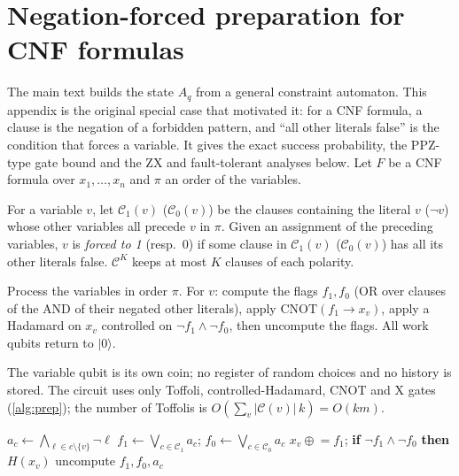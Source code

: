 \section{Negation-forced preparation for CNF formulas}\label{sec:nf}
The main text builds the state $A_q$ from a general constraint automaton. This appendix is the original special case that motivated it: for a CNF formula, a clause is the negation of a forbidden pattern, and ``all other literals false'' is the condition that forces a variable. It gives the exact success probability, the PPZ-type gate bound and the ZX and fault-tolerant analyses below.
Let $F$ be a CNF formula over $x_1,\dots,x_n$ and $\pi$ an order of the variables.
\begin{definition}
For a variable $v$, let $\mathcal C_1(v)$ ($\mathcal C_0(v)$) be the clauses containing the literal $v$ ($\neg v$) whose other variables all precede $v$ in $\pi$. Given an assignment of the preceding variables, $v$ is \emph{forced to 1} (resp.\ 0) if some clause in $\mathcal C_1(v)$ ($\mathcal C_0(v)$) has all its other literals false. $\mathcal C^{K}$ keeps at most $K$ clauses of each polarity.
\end{definition}
\begin{definition}
Process the variables in order $\pi$. For $v$: compute the flags $f_1,f_0$ (OR over clauses of the AND of their negated other literals), apply $\mathrm{CNOT}(f_1\!\to\!x_v)$, apply a Hadamard on $x_v$ controlled on $\neg f_1\wedge\neg f_0$, then uncompute the flags. All work qubits return to $|0\rangle$.
\end{definition}
The variable qubit is its own coin; no register of random choices and no history is stored. The circuit uses only Toffoli, controlled-Hadamard, CNOT and X gates (\cref{alg:prep}); the number of Toffolis is $O(\sum_v |\mathcal C(v)|\,k)=O(km)$.

\begin{algorithm}[t]
\caption{Negation-forced preparation $A^K_\pi$}\label{alg:prep}
\begin{algorithmic}[1]
\State $a_c \gets \bigwedge_{\ell\in c\setminus\{v\}} \neg\ell$ 
\EndFor
\State $f_1\gets\bigvee_{c\in\mathcal C_1}a_c$;\; $f_0\gets\bigvee_{c\in\mathcal C_0}a_c$
\State $x_v \mathrel{\oplus}= f_1$;\; \textbf{if} $\neg f_1\wedge\neg f_0$ \textbf{then} $H(x_v)$ 
\State uncompute $f_1,f_0,a_c$
\EndFor
\end{algorithmic}
\end{algorithm}

